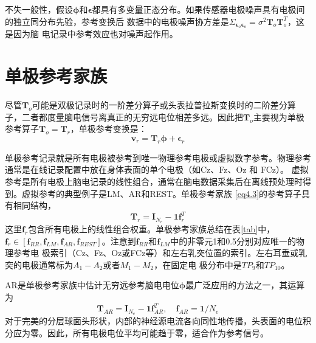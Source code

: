 不失一般性，假设$\mathbf{\phi}$和$\mathbf{\epsilon}$都具有多变量正态分布。如果传感器电极噪声具有电极间的独立同分布先验，参考变换后
数据中的电极噪声协方差是$\Sigma_{\mathbf{\epsilon}_o\mathbf{\epsilon}_o}=\sigma^2\mathbf{T}_{o}\mathbf{T}_{o}^T$，这是因为脑
电记录中参考效应也对噪声起作用。

\section{单极参考家族}
尽管$\mathbf{T}_{o}$可能是双极记录时的一阶差分算子或头表拉普拉斯变换时的二阶差分算子，二者都度量脑电信号离真正的无穷远电位相差多远。因此把$\mathbf{T}_o$主要视为单极参考算子$\mathbf{T}_o=\mathbf{T}_{r}$，单极参考变换是：
\begin{equation}\label{eq4.3}
\mathbf{v}_{r}=\mathbf{T}_{r}\mathbf{\phi}+\mathbf{\epsilon}_r
\end{equation}

单极参考记录就是所有电极被参考到唯一物理参考电极或虚拟数字参考。物理参考通常是在线记录配置中放在身体表面的单个电极（如Cz、Fz、Oz 和 FCz）。 虚拟参考是所有电极上脑电记录的线性组合，通常在脑电数据采集后在离线预处理时得到。虚拟参考的典型例子是LM、AR和REST。单极参考家族
\eqref{eq4.3}的参考算子具有相同结构，
\begin{equation}\label{eq4.4}
\mathbf{T}_{r}=\mathbf{I}_{N_e}-\mathbf{1f}_r^T
\end{equation}
这里$\mathbf{f}_r$包含所有电极上的线性组合权重。单极参考家族总结在表\ref{tab}中，$\mathbf{f}_r\in{[\mathbf{f}_{RR},\mathbf{f}_{LM},\mathbf{f}_{AR},\mathbf{f}_{REST}]}$。注意到$\mathbf{f}_{RR}$和$\mathbf{f}_{LM}$中的非零元1和0.5分别对应唯一的物理参考电
极索引（Cz、Fz、Oz或FCz等）和左右乳突位置的索引。左右耳垂或乳突的电极通常标为$A_1-A_2$或者$M_1-M_2$，在固定电
极分布中是$TP_9$和$TP_{10}$。

AR是单极参考家族中估计无穷远参考脑电电位$\mathbf{\phi}$最广泛应用的方法之一，其运算为
\begin{equation}\label{eq4.5}
\mathbf{T}_{AR}=\mathbf{I}_{N_e}-\mathbf{1f}_{AR}^T,\quad\mathbf{f}_{AR}=\mathbf{1}/{N_e}
\end{equation}
对于完美的分层球面头形状，内部的神经源电流各向同性地传播，头表面的电位积分应为零。因此，所有电极电位平均可能趋于零，适合作为参考信号。

